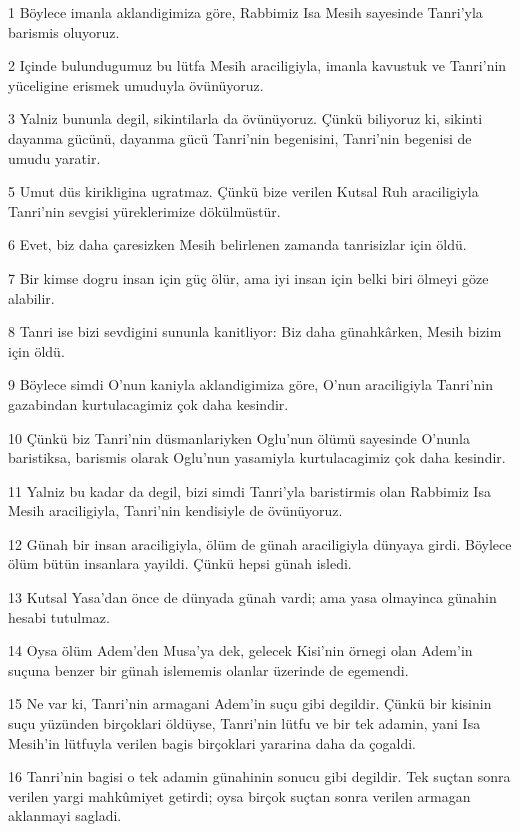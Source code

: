 \par 1 Böylece imanla aklandigimiza göre, Rabbimiz Isa Mesih sayesinde Tanri'yla barismis oluyoruz.
\par 2 Içinde bulundugumuz bu lütfa Mesih araciligiyla, imanla kavustuk ve Tanri'nin yüceligine erismek umuduyla övünüyoruz.
\par 3 Yalniz bununla degil, sikintilarla da övünüyoruz. Çünkü biliyoruz ki, sikinti dayanma gücünü, dayanma gücü Tanri'nin begenisini, Tanri'nin begenisi de umudu yaratir.
\par 5 Umut düs kirikligina ugratmaz. Çünkü bize verilen Kutsal Ruh araciligiyla Tanri'nin sevgisi yüreklerimize dökülmüstür.
\par 6 Evet, biz daha çaresizken Mesih belirlenen zamanda tanrisizlar için öldü.
\par 7 Bir kimse dogru insan için güç ölür, ama iyi insan için belki biri ölmeyi göze alabilir.
\par 8 Tanri ise bizi sevdigini sununla kanitliyor: Biz daha günahkârken, Mesih bizim için öldü.
\par 9 Böylece simdi O'nun kaniyla aklandigimiza göre, O'nun araciligiyla Tanri'nin gazabindan kurtulacagimiz çok daha kesindir.
\par 10 Çünkü biz Tanri'nin düsmanlariyken Oglu'nun ölümü sayesinde O'nunla baristiksa, barismis olarak Oglu'nun yasamiyla kurtulacagimiz çok daha kesindir.
\par 11 Yalniz bu kadar da degil, bizi simdi Tanri'yla baristirmis olan Rabbimiz Isa Mesih araciligiyla, Tanri'nin kendisiyle de övünüyoruz.
\par 12 Günah bir insan araciligiyla, ölüm de günah araciligiyla dünyaya girdi. Böylece ölüm bütün insanlara yayildi. Çünkü hepsi günah isledi.
\par 13 Kutsal Yasa'dan önce de dünyada günah vardi; ama yasa olmayinca günahin hesabi tutulmaz.
\par 14 Oysa ölüm Adem'den Musa'ya dek, gelecek Kisi'nin örnegi olan Adem'in suçuna benzer bir günah islememis olanlar üzerinde de egemendi.
\par 15 Ne var ki, Tanri'nin armagani Adem'in suçu gibi degildir. Çünkü bir kisinin suçu yüzünden birçoklari öldüyse, Tanri'nin lütfu ve bir tek adamin, yani Isa Mesih'in lütfuyla verilen bagis birçoklari yararina daha da çogaldi.
\par 16 Tanri'nin bagisi o tek adamin günahinin sonucu gibi degildir. Tek suçtan sonra verilen yargi mahkûmiyet getirdi; oysa birçok suçtan sonra verilen armagan aklanmayi sagladi.
